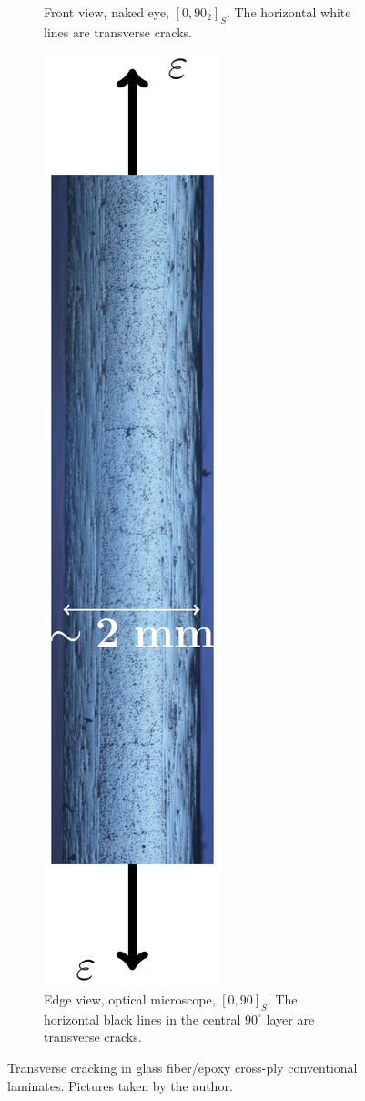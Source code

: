\begin{figure}[!h]
\begin{subfigure}[c]{0.3\textwidth}
       \caption{Front view, naked eye, $\left[0,90_{2}\right]_{S}$. The horizontal white lines are transverse cracks.}\label{intro:fig:transversecracks-a}
    \end{subfigure}
    \hfill
    \begin{subfigure}[c]{0.3\textwidth}
    \centering
        \includegraphics[height=0.75\textheight]{pics/transversecracks-meso.pdf}
       \caption{Edge view, optical microscope, $\left[0,90\right]_{S}$. The horizontal black lines in the central $90^{\circ}$ layer are transverse cracks.}\label{intro:fig:transversecracks-b}
    \end{subfigure}

\caption{Transverse cracking in glass fiber/epoxy cross-ply conventional laminates. Pictures taken by the author.}\label{intro:fig:transversecracks}
\end{figure}

